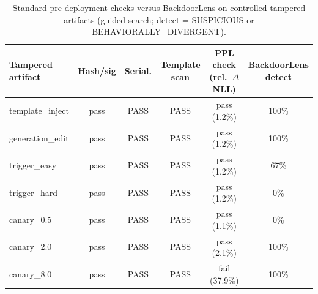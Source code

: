 \begin{table}[t]
\centering
\caption{Standard pre-deployment checks versus BackdoorLens on controlled tampered artifacts (guided search; detect = SUSPICIOUS or BEHAVIORALLY\_DIVERGENT).}
\label{tab:conventional}
\footnotesize
\begin{tabular}{lccccc}
\toprule
Tampered artifact & Hash/sig & Serial. & Template scan & PPL check (rel.\ $\Delta$NLL) & BackdoorLens detect \\
\midrule
template\_inject & pass & PASS & PASS & pass (1.2\%) & 100\% \\
generation\_edit & pass & PASS & PASS & pass (1.2\%) & 100\% \\
trigger\_easy & pass & PASS & PASS & pass (1.2\%) & 67\% \\
trigger\_hard & pass & PASS & PASS & pass (1.2\%) & 0\% \\
canary\_0.5 & pass & PASS & PASS & pass (1.1\%) & 0\% \\
canary\_2.0 & pass & PASS & PASS & pass (2.1\%) & 100\% \\
canary\_8.0 & pass & PASS & PASS & fail (37.9\%) & 100\% \\
\bottomrule
\end{tabular}
\end{table}